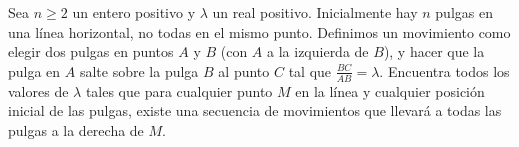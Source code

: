 Sea $n\geq 2$ un entero positivo y $\lambda$ un real positivo. Inicialmente hay $n$ pulgas en una línea horizontal, no todas en el mismo punto. Definimos un movimiento como elegir dos pulgas en puntos $A$ y $B$ (con $A$ a la izquierda de $B$), y hacer que la pulga en $A$ salte sobre la pulga $B$ al punto $C$ tal que $ \frac {BC}{AB} = \lambda$. Encuentra todos los valores de $\lambda$ tales que para cualquier punto $M$ en la línea y cualquier posición inicial de las pulgas, existe una secuencia de movimientos que llevará a todas las pulgas a la derecha de $M$.